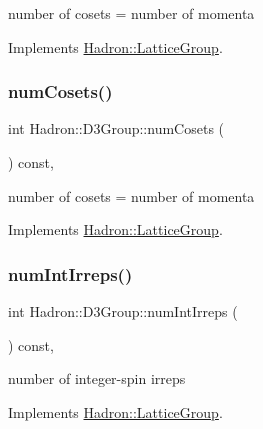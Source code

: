 number of cosets = number of momenta 

Implements \mbox{\hyperlink{structHadron_1_1LatticeGroup_afc76430f36a3a041f86d4058c59bf55e}{Hadron\+::\+Lattice\+Group}}.

\mbox{\label{structHadron_1_1D3Group_a33af6b6378351a7b023c23940c69403f}} 
\subsubsection{\texorpdfstring{numCosets()}{numCosets()}\hspace{0.1cm}{\footnotesize\ttfamily [2/2]}}
{\footnotesize\ttfamily int Hadron\+::\+D3\+Group\+::num\+Cosets (\begin{DoxyParamCaption}{ }\end{DoxyParamCaption}) const\hspace{0.3cm}{\ttfamily [inline]}, {\ttfamily [virtual]}}

number of cosets = number of momenta 

Implements \mbox{\hyperlink{structHadron_1_1LatticeGroup_afc76430f36a3a041f86d4058c59bf55e}{Hadron\+::\+Lattice\+Group}}.

\mbox{\label{structHadron_1_1D3Group_a442d9bebc6eae854024be8123fda60d8}} 
\subsubsection{\texorpdfstring{numIntIrreps()}{numIntIrreps()}\hspace{0.1cm}{\footnotesize\ttfamily [1/2]}}
{\footnotesize\ttfamily int Hadron\+::\+D3\+Group\+::num\+Int\+Irreps (\begin{DoxyParamCaption}{ }\end{DoxyParamCaption}) const\hspace{0.3cm}{\ttfamily [inline]}, {\ttfamily [virtual]}}

number of integer-\/spin irreps 

Implements \mbox{\hyperlink{structHadron_1_1LatticeGroup_af2aa7b39222bf188389356eefcef7547}{Hadron\+::\+Lattice\+Group}}.

\mbox{\label{structHadron_1_1D3Group_a442d9bebc6eae854024be8123fda60d8}} 
